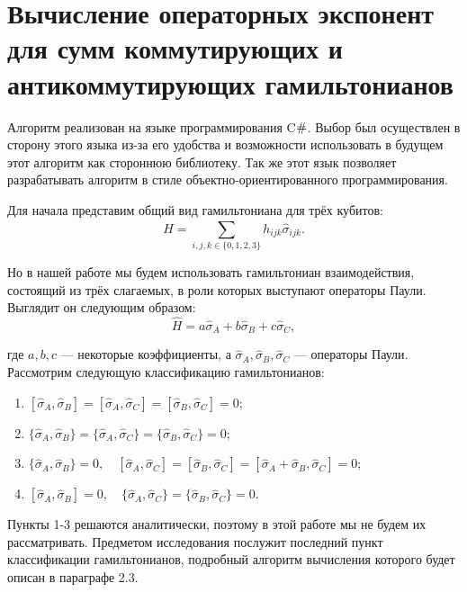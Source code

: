 \documentclass[a4paper]{report}
\begin{document}
\newpage


\section{Вычисление операторных экспонент для сумм коммутирующих и антикоммутирующих гамильтонианов}
Алгоритм реализован на языке программирования C$\small{\#}$. Выбор был осуществлен в сторону этого языка из-за его удобства и возможности использовать в будущем этот алгоритм как стороннюю библиотеку. Так же этот язык позволяет разрабатывать алгоритм в стиле объектно-ориентированного программирования.

Для начала представим общий вид гамильтониана для трёх кубитов:
$$
    \hat{H} = \sum_{i,j,k\in\{0,1,2,3\}} h_{ijk}\hat{\sigma}_{ijk}.
$$

\noindent Но в нашей работе мы будем использовать гамильтониан взаимодействия, состоящий из трёх слагаемых, в роли которых выступают операторы Паули. Выглядит он следующим образом:
\begin{equation}\tag{8}\label{eq8}
    \hat{H} = a\hat{\sigma}_A + b\hat{\sigma}_B + c\hat{\sigma}_C,
\end{equation}

\noindent где $a, b, c$ --- некоторые коэффициенты, а $\hat{\sigma}_A, \hat{\sigma}_B, \hat{\sigma}_C$ --- операторы Паули.\\

Рассмотрим следующую классификацию гамильтонианов:
\begin{enumerate}
\item $[\hat{\sigma}_A, \hat{\sigma}_B] = [\hat{\sigma}_A, \hat{\sigma}_C] = [\hat{\sigma}_B, \hat{\sigma}_C] = 0$;
\item $\{\hat{\sigma}_A, \hat{\sigma}_B\} = \{\hat{\sigma}_A, \hat{\sigma}_C\} = \{\hat{\sigma}_B, \hat{\sigma}_C\} = 0$;
\item $\{\hat{\sigma}_A, \hat{\sigma}_B\} = 0,\quad [\hat{\sigma}_A, \hat{\sigma}_C] = [\hat{\sigma}_B, \hat{\sigma}_C] = [\hat{\sigma}_A + \hat{\sigma}_B, \hat{\sigma}_C] = 0$;
\item $[\hat{\sigma}_A, \hat{\sigma}_B] = 0,\quad \{\hat{\sigma}_A, \hat{\sigma}_C\} = \{\hat{\sigma}_B, \hat{\sigma}_C\} = 0$.
\end{enumerate}

Пункты 1-3 решаются аналитически, поэтому в этой работе мы не будем их рассматривать. Предметом исследования послужит последний пункт классификации гамильтонианов, подробный алгоритм вычисления которого будет описан в параграфе 2.3.
\end{document}
